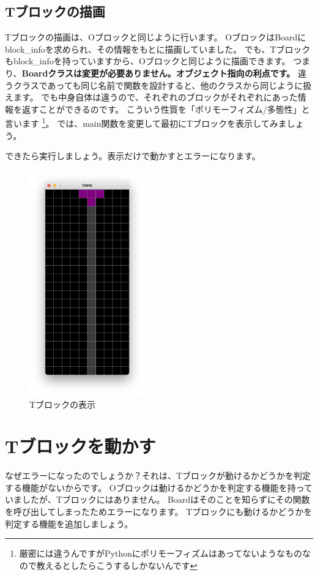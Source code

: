 \subsection{Tブロックの描画}
Tブロックの描画は、Oブロックと同じように行います。
OブロックはBoardにblock\_infoを求められ、その情報をもとに描画していました。
でも、Tブロックもblock\_infoを持っていますから、Oブロックと同じように描画できます。
つまり、\textbf{Boardクラスは変更が必要ありません。オブジェクト指向の利点です。}
違うクラスであっても同じ名前で関数を設計すると、他のクラスから同じように扱えます。
でも中身自体は違うので、それぞれのブロックがそれぞれにあった情報を返すことができるのです。
こういう性質を「ポリモーフィズム/多態性」と言います
\footnote{厳密には違うんですがPythonにポリモーフィズムはあってないようなものなので教えるとしたらこうするしかないんです}。
では、main関数を変更して最初にTブロックを表示してみましょう。

できたら実行しましょう。表示だけで動かすとエラーになります。
\begin{figure}[h]
  \centering
  \includegraphics[width=50mm]{images/CH7_2.png}
  \caption{Tブロックの表示}
\end{figure}

\section{Tブロックを動かす}
なぜエラーになったのでしょうか？それは、Tブロックが動けるかどうかを判定する機能がないからです。
Oブロックは動けるかどうかを判定する機能を持っていましたが、Tブロックにはありません。
Boardはそのことを知らずにその関数を呼び出してしまったためエラーになります。
Tブロックにも動けるかどうかを判定する機能を追加しましょう。
